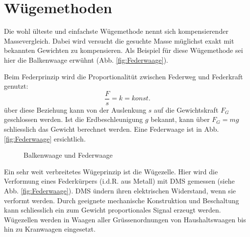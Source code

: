 \section{Wügemethoden}
Die  wohl ülteste und einfachste Wügemethode nennt sich
kompensierender Massevergleich. Dabei wird versucht die gesuchte Masse
müglichst exakt mit bekannten Gewichten zu kompensieren. Als Beispiel für diese Wügemethode sei hier die Balkenwaage erwühnt (Abb. \ref{fig:Federwaage}).

Beim 
Federprinzip wird die Proportionalitüt zwischen Federweg und Federkraft genutzt:
\begin{equation*}
\frac{F}{s} = k = konst.
\end{equation*}
über diese Beziehung kann von der Auslenkung $s$ auf die Gewichtskraft $F_G$ geschlossen werden. Ist die Erdbeschleunigung $g$ bekannt, kann über $F_G=m g$ schliesslich das Gewicht berechnet werden. \cite{kuchling} Eine Federwaage ist in Abb. \ref{fig:Federwaage} ersichtlich.

\begin{figure}[htb]
	\centering
		\hspace{2cm}
		\caption{Balkenwaage und Federwaage}
\end{figure}

Ein 
sehr weit verbreitetes Wügeprinzip ist die Wügezelle. Hier wird die Verformung eines Federkürpers (i.d.R. aus Metall) mit \ac{DMS} gemessen (siehe Abb. \ref{fig:Federwaage}). \ac{DMS} ündern ihren elektrischen Widerstand, wenn sie verformt werden. Durch geeignete mechanische Konstruktion und Beschaltung kann schliesslich ein zum Gewicht proportionales Signal erzeugt werden. Wügezellen werden in Waagen aller Grüssenordnungen von Haushaltswaagen bis hin zu Kranwaagen eingesetzt.

